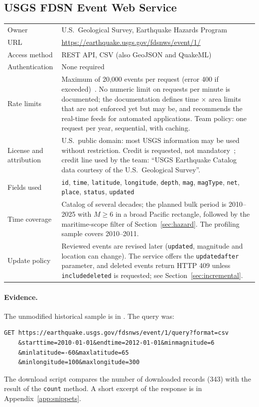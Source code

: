 \documentclass[a4paper,11pt,oneside]{book}
\begin{document}
\subsection{USGS FDSN Event Web Service}
\noindent\begin{tabularx}{\textwidth}{@{}lX@{}}
\toprule
Owner & U.S.\ Geological Survey, Earthquake Hazards Program \\
URL & \url{https://earthquake.usgs.gov/fdsnws/event/1/} \\
Access method & REST API, CSV (also GeoJSON and QuakeML) \\
Authentication & None required \\
Rate limits & Maximum of 20,000 events per request (error 400 if exceeded)~\cite{usgsfdsn}. No numeric limit on requests per minute is documented; the documentation defines time $\times$ area limits that are not enforced yet but may be, and recommends the real-time feeds for automated applications. Team policy: one request per year, sequential, with caching. \\
License and attribution & U.S.\ public domain: most USGS information may be used without restriction. Credit is requested, not mandatory~\cite{usgscredit}; credit line used by the team: ``USGS Earthquake Catalog data courtesy of the U.S.\ Geological Survey''. \\
Fields used & \texttt{id}, \texttt{time}, \texttt{latitude}, \texttt{longitude}, \texttt{depth}, \texttt{mag}, \texttt{magType}, \texttt{net}, \texttt{place}, \texttt{status}, \texttt{updated} \\
Time coverage & Catalog of several decades; the planned bulk period is 2010--2025 with $M \geq 6$ in a broad Pacific rectangle, followed by the maritime-scope filter of Section~\ref{sec:hazard}. The profiling sample covers 2010--2011. \\
Update policy & Reviewed events are revised later (\texttt{updated}, magnitude and location can change). The service offers the \texttt{updatedafter} parameter, and deleted events return HTTP 409 unless \texttt{includedeleted} is requested; see Section~\ref{sec:incremental}. \\
\bottomrule
\end{tabularx}

\paragraph{Evidence.}
The unmodified historical sample is
 in
.
The query was:
\begin{lstlisting}
GET https://earthquake.usgs.gov/fdsnws/event/1/query?format=csv
    &starttime=2010-01-01&endtime=2012-01-01&minmagnitude=6
    &minlatitude=-60&maxlatitude=65
    &minlongitude=100&maxlongitude=300
\end{lstlisting}
The download script compares the number of downloaded records (343) with the result of the \texttt{count} method.
A short excerpt of the response is in Appendix~\ref{app:snippets}.
\end{document}
